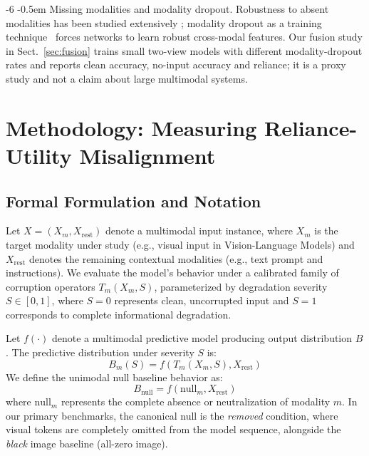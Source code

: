 \documentclass[graybox]{svmult}
\makeatletter
\renewcommand\paragraph{\@startsection{paragraph}{4}{\z@}%
  {-6\p@ \@plus -2\p@ \@minus -2\p@}%
  {-0.5em}%
  {\normalfont\normalsize\bfseries}}
\makeatother
\begin{document}
\paragraph{Missing modalities and modality dropout.}
Robustness to absent modalities has been studied extensively
\cite{ma2022missing}; modality dropout as a training
technique~\cite{neverova2016moddrop} forces networks to learn robust
cross-modal features.
Our fusion study in Sect.~\ref{sec:fusion} trains small two-view models
with different modality-dropout rates and reports clean accuracy,
no-input accuracy and reliance; it is a proxy study and not a claim about
large multimodal systems.

\section{Methodology: Measuring Reliance-Utility Misalignment}
\label{sec:method}

\subsection{Formal Formulation and Notation}
Let $X = (X_m, X_{\text{rest}})$ denote a multimodal input instance, where $X_m$ is the target modality under study (e.g., visual input in Vision-Language Models) and $X_{\text{rest}}$ denotes the remaining contextual modalities (e.g., text prompt and instructions). We evaluate the model's behavior under a calibrated family of corruption operators $T_m(X_m, S)$, parameterized by degradation severity $S \in [0, 1]$, where $S=0$ represents clean, uncorrupted input and $S=1$ corresponds to complete informational degradation.

Let $f(\cdot)$ denote a multimodal predictive model producing output distribution $B$. The predictive distribution under severity $S$ is:
\begin{equation}
B_m(S) = f(T_m(X_m, S), X_{\text{rest}})
\end{equation}
We define the unimodal null baseline behavior as:
\begin{equation}
B_{\text{null}} = f(\text{null}_m, X_{\text{rest}})
\end{equation}
where $\text{null}_m$ represents the complete absence or neutralization of modality $m$. In our primary benchmarks, the canonical null is the \emph{removed} condition, where visual tokens are completely omitted from the model sequence, alongside the \emph{black} image baseline (all-zero image).
\end{document}
